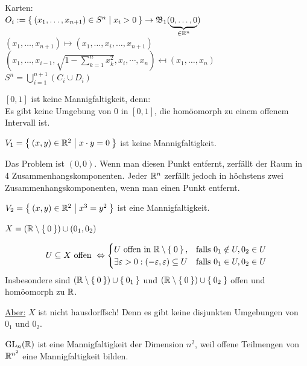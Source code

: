 \begin{beispiel}
\begin{bspenum}
              Karten: \\
              $O_i := \Set{(x_1, \dots, x_{n+1}) \in S^n | x_i > 0} \rightarrow \mathfrak{B}_1 (\underbrace{0, \dots, 0}_{\in \mathbb{R}^n})$\\
              $(x_1, \dots, x_{n+1}) \mapsto (x_1, \dots, x_i, \dots, x_{n+1})$\\
              $(x_1, \dots, x_{i-1}, \sqrt{1-\sum_{k=1}^n x_k^2}, x_i, \cdots, x_n)\mapsfrom (x_1, \dots, x_n)$\\
              $S^n = \bigcup_{i=1}^{n+1} (C_i \cup D_i)$
        \item $[0,1]$ ist keine Mannigfaltigkeit, denn:\\
              Es gibt keine Umgebung von $0$ in $[0,1]$, die homöomorph
              zu einem offenem Intervall ist.
        \item $V_1 = \Set{(x,y) \in \ensuremath{\mathbb{R}}^2 | x \cdot y = 0}$ ist
              keine Mannigfaltigkeit. 

              Das Problem ist $(0,0)$. Wenn man diesen Punkt entfernt,
              zerfällt der Raum in 4 Zusammenhangskomponenten.
              Jeder $\mathbb{R}^n$ zerfällt jedoch in höchstens zwei
              Zusammenhangskomponenten, wenn man einen Punkt entfernt.
        \item $V_2 = \Set{(x,y) \in \ensuremath{\mathbb{R}}^2 | x^3 = y^2}$ ist eine
              Mannigfaltigkeit.
        \item $X = (\mathbb{R} \setminus \Set{0}) \cup (0_1, 0_2)$ \label{bsp:mannigfaltigkeit8}

              \[U \subseteq X \text{ offen } \Leftrightarrow 
                \begin{cases}
                    U \text{ offen in } \mathbb{R} \setminus \Set{0}, &\text{falls } 0_1 \notin U, 0_2 \in U\\
                    \exists \varepsilon > 0: (-\varepsilon, \varepsilon) \subseteq U &\text{falls } 0_1 \in U, 0_2 \in U
                \end{cases}\]
              Insbesondere sind $(\mathbb{R} \setminus \Set{0}) \cup \Set{0_1}$
              und $(\mathbb{R} \setminus \Set{0}) \cup \Set{0_2}$ offen und
              homöomorph zu $\mathbb{R}$.

              \underline{Aber:} $X$ ist nicht hausdorffsch!
              Denn es gibt keine disjunkten Umgebungen von $0_1$ und
              $0_2$.
        \item $\mathrm{GL}_n(\mathbb{R})$ ist eine Mannigfaltigkeit der Dimension 
              $n^2$, weil offene Teilmengen von $\mathbb{R}^{n^2}$ eine
              Mannigfaltigkeit bilden.
    \end{bspenum}
\end{beispiel}

